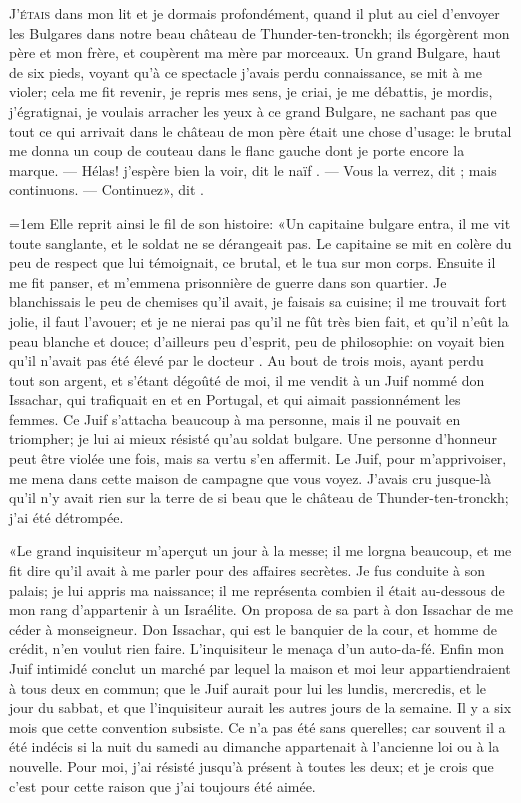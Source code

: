 \lettrine[ante={«}]{J'}{étais} dans mon lit et je dormais profondément, quand il plut au ciel
d’envoyer les Bulgares dans notre beau château de Thunder-ten-tronckh;
ils égorgèrent mon père et mon frère, et coupèrent ma mère par
morceaux. Un grand Bulgare, haut de six pieds, voyant qu’à ce spectacle
j’avais perdu connaissance, se mit à me violer; cela me fit revenir, je
repris mes sens, je criai, je me débattis, je mordis, j’égratignai, je
voulais arracher les yeux à ce grand Bulgare, ne sachant pas que tout
ce qui arrivait dans le château de mon père était une chose d’usage: le
brutal me donna un coup de couteau dans le flanc gauche dont je porte
encore la marque. — Hélas! j’espère bien la voir, dit le naïf .
— Vous la verrez, dit ; mais continuons. — Continuez», dit .

{\parfillskip=1em
Elle reprit ainsi le fil de son histoire: «Un capitaine bulgare entra,
il me vit toute sanglante, et le soldat ne se dérangeait pas. Le
capitaine se mit en colère du peu de respect que lui témoignait, ce
brutal, et le tua sur mon corps. Ensuite il me fit panser, et m’emmena
prisonnière de guerre dans son quartier. Je blanchissais le peu de
chemises qu’il avait, je faisais sa cuisine; il me trouvait fort jolie,
il faut l’avouer; et je ne nierai pas qu’il ne fût très bien fait, et
qu’il n’eût la peau blanche et douce; d’ailleurs peu d’esprit, peu de
philosophie: on voyait bien qu’il n’avait pas été élevé par le docteur
. Au bout de trois mois, ayant perdu tout son argent, et
s’étant dégoûté de moi, il me vendit à un Juif nommé don Issachar, qui
trafiquait en  et en Portugal, et qui aimait passionnément les
femmes. Ce Juif s’attacha beaucoup à ma personne, mais il ne pouvait en
triompher; je lui ai mieux résisté qu’au soldat bulgare. Une personne
d’honneur peut être violée une fois, mais sa vertu s’en affermit. Le
Juif, pour m’apprivoiser, me mena dans cette maison de campagne que
vous voyez. J’avais cru jusque-là qu’il n’y avait rien sur la terre de
si beau que le château de Thunder-ten-tronckh; j’ai été détrompée.

}

«Le grand inquisiteur m’aperçut un jour à la messe; il me lorgna
beaucoup, et me fit dire qu’il avait à me parler pour des affaires
secrètes. Je fus conduite à son palais; je lui appris ma naissance; il
me représenta combien il était au-dessous de mon rang d’appartenir à un
Israélite. On proposa de sa part à don Issachar de me céder à
monseigneur. Don Issachar, qui est le banquier de la cour, et homme de
crédit, n’en voulut rien faire. L’inquisiteur le menaça d’un
auto-da-fé. Enfin mon Juif intimidé conclut un marché par lequel la
maison et moi leur appartiendraient à tous deux en commun; que le Juif
aurait pour lui les lundis, mercredis, et le jour du sabbat, et que
l’inquisiteur aurait les autres jours de la semaine. Il y a six mois
que cette convention subsiste. Ce n’a pas été sans querelles; car
souvent il a été indécis si la nuit du samedi au dimanche appartenait à
l’ancienne loi ou à la nouvelle. Pour moi, j’ai résisté jusqu’à présent
à toutes les deux; et je crois que c’est pour cette raison que j’ai
toujours été aimée.

